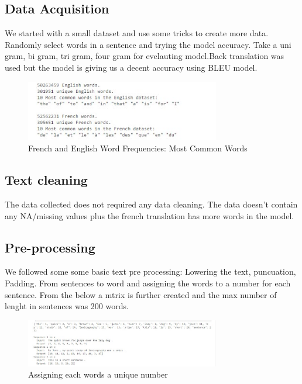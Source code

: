\documentclass{article}
\begin{document}
\subsection{Data Acquisition}

We started with a small dataset and use some tricks to create more data. Randomly select words in a sentence and trying the model accuracy. Take a uni gram, bi gram, tri gram, four gram for evelauting model.Back translation was used but the model is giving us a decent accuracy using BLEU model. \cite{zou2013bilingual}

\begin{figure}[htp]
    \centering
    \includegraphics[width=8.5cm]{2.jpg}
    \caption{French and English Word Frequencies: Most Common Words}
    \label{fig:galaxy}
\end{figure}


\subsection{Text cleaning}
The data collected does not required any data cleaning. The data doesn't contain any NA/missing values plus the french translation has more words in the model.  

\subsection{Pre-processing}
We followed some some basic text pre processing:
Lowering the text, puncuation, Padding. From sentences to word and assigning the words to a number for each sentence. From the below a mtrix is further created and the max number of lenght in sentences was 200 words. 

\begin{figure}[htp]
    \centering
    \includegraphics[width=8.5cm]{3.jpg}
    \caption{Assigning each words a unique number}
    \label{fig:galaxy}
\end{figure}
\end{document}
